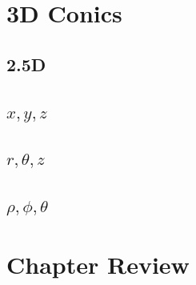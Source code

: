 \section{3D Conics}
\noindent{}
\subsection{2.5D}
\subsection{$x, y, z$}
\subsection{$r, \theta, z$}
\subsection{$\rho, \phi, \theta$}

\section{Chapter Review}